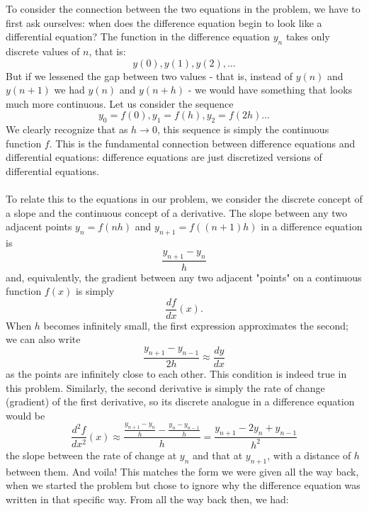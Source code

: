 \documentclass{article}
\begin{document}
To consider the connection between the two equations in the problem, we have to first ask ourselves: when does the difference equation begin to look like a differential equation? The function in the difference equation $y_n$ takes only discrete values of $n$, that is: 
\begin{equation*}
    y(0), y(1), y(2), \dots
\end{equation*}
But if we lessened the gap between two values - that is, instead of $y(n)$ and $y(n+1)$ we had $y(n)$ and $y(n+h)$ - we would have something that looks much more continuous. Let us consider the sequence
\begin{equation*}
    y_0 = f(0), y_1 = f(h), y_2 = f(2h)\dots
\end{equation*}
We clearly recognize that as $h \to 0$, this sequence is simply the continuous function $f$. This is the fundamental connection between difference equations and differential equations: difference equations are just discretized versions of differential equations. \\ \\
To relate this to the equations in our problem, we consider the discrete concept of a slope and the continuous concept of a derivative. The slope between any two adjacent points $y_n=f(nh)$ and $y_{n+1}=f((n+1)h)$ in a difference equation is 
\begin{equation*}
    \frac{y_{n+1}-y_n}{h}
\end{equation*}
and, equivalently, the gradient between any two adjacent "points" on a continuous function $f(x)$ is simply 
\begin{equation*}
    \frac{df}{dx}(x).
\end{equation*}
When $h$ becomes infinitely small, the first expression approximates the second; we can also write 
\begin{equation*}
    \frac{y_{n+1}-y_{n-1}}{2h} \approx \frac{dy}{dx}
\end{equation*}
as the points are infinitely close to each other. This condition is indeed true in this problem. Similarly, the second derivative is simply the rate of change (gradient) of the first derivative, so its discrete analogue in a difference equation would be 
\begin{equation*}
    \frac{d^2 f}{dx^2} (x) \approx \frac{\frac{y_{n+1}-y_{n}}{h} - \frac{y_{n}-y_{n-1}}{h}}{h} = \frac{y_{n+1}-2y_n +y_{n-1}}{h^2}
\end{equation*}
the slope between the rate of change at $y_n$ and that at $y_{n+1}$, with a distance of $h$ between them. And voila! This matches the form we were given all the way back, when we started the problem but chose to ignore why the difference equation was written in that specific way. From all the way back then, we had:
\end{document}
